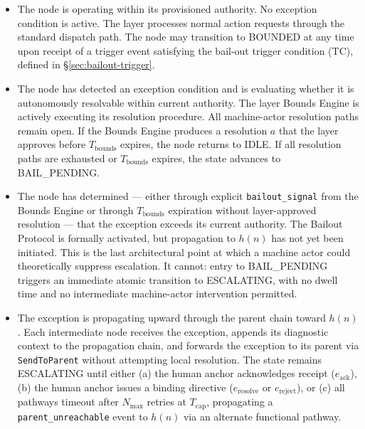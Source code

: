 \begin{itemize}\itemsep0em
\item[\textbf{IDLE.}] The node is operating within its provisioned authority. No exception condition is active. The \fact{} layer processes normal action requests through the standard dispatch path. The node may transition to BOUNDED at any time upon receipt of a trigger event satisfying the bail-out trigger condition (TC), defined in \S\ref{sec:bailout-trigger}.

\item[\textbf{BOUNDED.}] The node has detected an exception condition and is evaluating whether it is autonomously resolvable within current authority. The \bounds{} layer Bounds Engine is actively executing its resolution procedure. All machine-actor resolution paths remain open. If the Bounds Engine produces a resolution $a$ that the \fact{} layer approves before $T_{\text{bounds}}$ expires, the node returns to IDLE. If all resolution paths are exhausted or $T_{\text{bounds}}$ expires, the state advances to BAIL\_PENDING.

\item[\textbf{BAIL\_PENDING.}] The node has determined — either through explicit \texttt{bailout\_signal} from the Bounds Engine or through $T_{\text{bounds}}$ expiration without \fact{} layer-approved resolution — that the exception exceeds its current authority. The Bailout Protocol is formally activated, but propagation to $h(n)$ has not yet been initiated. This is the last architectural point at which a machine actor could theoretically suppress escalation. It cannot: entry to BAIL\_PENDING triggers an immediate atomic transition to ESCALATING, with no dwell time and no intermediate machine-actor intervention permitted.

\item[\textbf{ESCALATING.}] The exception is propagating upward through the parent chain toward $h(n)$. Each intermediate node receives the exception, appends its diagnostic context to the propagation chain, and forwards the exception to its parent via \texttt{SendToParent} without attempting local resolution. The state remains ESCALATING until either (a) the human anchor acknowledges receipt ($e_{\text{ack}}$), (b) the human anchor issues a binding directive ($e_{\text{resolve}}$ or $e_{\text{reject}}$), or (c) all pathways timeout after $N_{\max}$ retries at $T_{\text{cap}}$, propagating a \texttt{parent\_unreachable} event to $h(n)$ via an alternate functional pathway.


\end{itemize}
